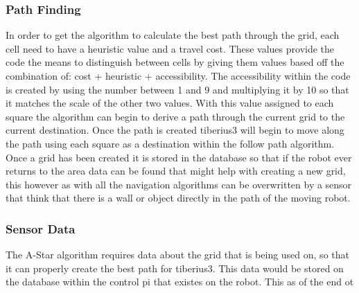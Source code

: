 \subsubsection{Path Finding}
In order to get the algorithm to calculate the best path through the grid, each cell need to have a heuristic value and a travel cost. These values provide the code the means to distinguish between cells by giving them values based off the combination of: cost + heuristic + accessibility. The accessibility within the code is created by using the number between 1 and 9 and multiplying it by 10 so that it matches the scale of the other two values. With this value assigned to each square the algorithm can begin to derive a path through the current grid to the current destination. Once the path is created \gls{tiberius3} will begin to move along the path using each square as a destination within the follow path algorithm. Once a grid has been created it is stored in the database so that if the robot ever returns to the area data can be found that might help with creating a new grid, this however as with all the navigation algorithms can be overwritten by a sensor that think that there is a wall or object directly in the path of the moving robot.
\subsubsection{Sensor Data}
The A-Star algorithm requires data about the grid that is being used on, so that it can properly create the best path for \gls{tiberius3}. This data would be stored on the database within the control pi that existes on the robot. This as of the end ot






















